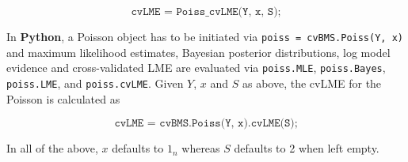 \begin{equation} \label{eq:Poiss-cvLME-MATLAB}
\texttt{cvLME = Poiss\_cvLME(Y, x, S);}
\end{equation}

In \textbf{Python}, a Poisson object has to be initiated via \verb|poiss = cvBMS.Poiss(Y, x)| and maximum likelihood estimates, Bayesian posterior distributions, log model evidence and cross-validated LME are evaluated via \verb|poiss.MLE|, \verb|poiss.Bayes|, \verb|poiss.LME|, and \verb|poiss.cvLME|. Given $Y$, $x$ and $S$ as above, the cvLME for the Poisson is calculated as

\begin{equation} \label{eq:Poisson-cvLME-Python}
\texttt{cvLME = cvBMS.Poiss(Y, x).cvLME(S);}
\end{equation}

In all of the above, $x$ defaults to $1_n$ whereas $S$ defaults to 2 when left empty.